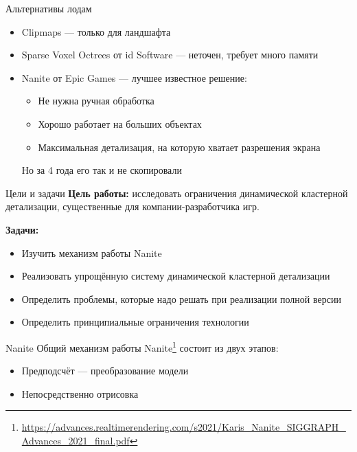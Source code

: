 \documentclass{beamer}
\begin{document}
    \begin{frame}{Альтернативы лодам}
        \begin{itemize}
            \item Clipmaps --- только для ландшафта
            \item Sparse Voxel Octrees от id Software --- неточен, требует много памяти
            \item Nanite от Epic Games --- лучшее известное решение:
            \begin{itemize}
                \item Не нужна ручная обработка
                \item Хорошо работает на больших объектах
                \item Максимальная детализация, на которую хватает разрешения экрана
            \end{itemize}

            \alert{Но за 4 года его так и не скопировали}
        \end{itemize}
    \end{frame}

    \begin{frame}{Цели и задачи}
        \textbf{Цель работы:}
        исследовать ограничения динамической кластерной детализации,
        существенные для компании-разработчика игр.

        \bigskip

        \textbf{Задачи:}
        \begin{itemize}
            \item Изучить механизм работы Nanite
            \item Реализовать упрощённую систему динамической кластерной детализации
            \item Определить проблемы, которые надо решать при реализации полной версии
            \item Определить принципиальные ограничения технологии
        \end{itemize}
    \end{frame}

    \begin{frame}{Nanite}
        Общий механизм работы Nanite\footnote{\url{https://advances.realtimerendering.com/s2021/Karis_Nanite_SIGGRAPH_Advances_2021_final.pdf}} состоит из двух этапов:
        \begin{itemize}
            \item Предподсчёт --- преобразование модели
            \item Непосредственно отрисовка
        \end{itemize}
    \end{frame}
\end{document}
